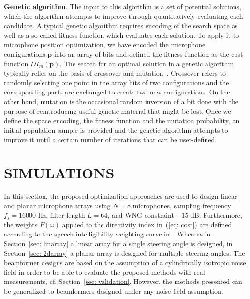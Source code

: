\documentclass[9pt]{article}
\begin{document}
\textbf{Genetic algorithm}.
The input to this algorithm is a set of potential solutions, which the algorithm attempts to improve through quantitatively evaluating each candidate. 
A typical genetic algorithm requires encoding of the search space as well as a so-called fitness function which evaluates each solution. 
To apply it to microphone position optimization, we have encoded the microphone configurations $\mathbf{p}$ into an array of bits and defined the fitness function as the cost function $DI_{m}(\mathbf{p})$.
The search for an optimal solution in a genetic algorithm typically relies on the basis of crossover and mutation~\cite{GAbook}.
Crossover refers to randomly selecting one point in the array bits of two configurations and the corresponding parts are exchanged to create two new configurations. 
On the other hand, mutation is the occasional random inversion of a bit done with the purpose of reintroducing useful genetic material that might be lost. 
Once we define the space encoding, the fitness function and the mutation probability, an initial population sample is provided and the genetic algorithm attempts to improve it until a certain number of iterations that can be user-defined. \vspace{-1cm}

\section{SIMULATIONS}
\vspace{-0.2cm}
In this section, the proposed optimization approaches are used to design linear and planar microphone arrays using $N=8$ microphones, sampling frequency $f_s = 16000$ Hz, filter length $L = 64$, and WNG constraint $-15$ dB. Furthermore, the weights $F(\omega)$ applied to the directivity index in~(\ref{eq: cost}) are defined according to the speech intelligibility weighting curve in~{\cite{ANSI}}. Whereas in Section~\ref{sec: linarray} a linear array for a single steering angle is designed, in Section~\ref{sec: 2darray} a planar array is designed for multiple steering angles. The beamformer designs are based on the assumption of a cylindrically isotropic noise field in order to be able to evaluate the proposed methods with real measurements, cf. Section~\ref{sec: validation}. However, the methods presented can be generalized to beamformers designed under any noise field assumption.
\end{document}
